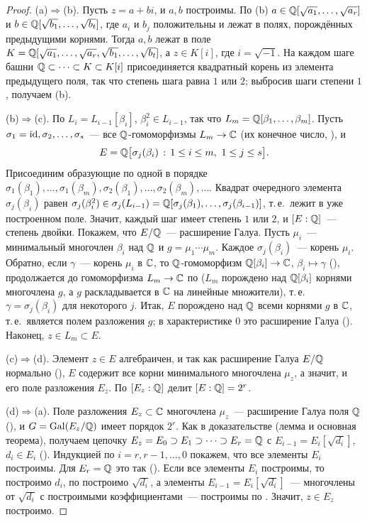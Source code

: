 \begin{proof}
(a)$\Rightarrow$(b). Пусть $z=a+bi$, и $a,b$ построимы. По (b) $a\in\mathbb Q[\sqrt{a_1},\dots,\sqrt{a_r}]$ и
$b\in\mathbb Q[\sqrt{b_1},\dots,\sqrt{b_t}]$, где $a_i$ и $b_j$ положительны и лежат в полях, порождённых предыдущими
корнями. Тогда $a,b$ лежат в поле $K=\mathbb Q[\sqrt{a_1},\dots,\sqrt{a_r},\sqrt{b_1},\dots,\sqrt{b_t}]$, а $z\in K[i]$, где
$i=\sqrt{-1}$. На каждом шаге башни $\mathbb Q\subset\dots\subset K\subset K[i]$ присоединяется квадратный корень из элемента
предыдущего поля, так что степень шага равна $1$ или $2$; выбросив шаги степени $1$, получаем (b).

(b)$\Rightarrow$(c). По  $L_i=L_{i-1}[\beta_i]$, $\beta_i^2\in L_{i-1}$, так что $L_m=\mathbb Q[\beta_1,\dots,\beta_m]$. Пусть
$\sigma_1=\operatorname{id},\sigma_2,\dots,\sigma_s$~--- все $\mathbb Q$-гомоморфизмы $L_m\to\mathbb C$ (их конечное число, ), и
\[
E=\Q\bigl[\sigma_j(\beta_i)\,:\,1\le i\le m,\ 1\le j\le s\bigr].
\]
Присоединим образующие по одной в порядке $\sigma_1(\beta_1),\dots,\sigma_1(\beta_m),\sigma_2(\beta_1),\dots,\sigma_2(\beta_m),\dots$.
Квадрат очередного элемента $\sigma_j(\beta_i)$ равен $\sigma_j(\beta_i^2)\in\sigma_j(L_{i-1})=\mathbb Q[\sigma_j(\beta_1),\dots,\sigma_j(\beta_{i-1})]$,
т.\,е.\ лежит в уже построенном поле. Значит, каждый шаг имеет степень $1$ или $2$, и $[E:\mathbb Q]$~--- степень двойки.
Покажем, что $E/\mathbb Q$~--- расширение Галуа. Пусть $\mu_i$~--- минимальный многочлен $\beta_i$ над $\mathbb Q$ и
$g=\mu_1\cdots\mu_m$. Каждое $\sigma_j(\beta_i)$~--- корень $\mu_i$. Обратно, если $\gamma$~--- корень $\mu_i$ в $\mathbb C$, то
$\mathbb Q$-гомоморфизм $\mathbb Q[\beta_i]\to\mathbb C$, $\beta_i\mapsto\gamma$ (), продолжается до гомоморфизма $L_m\to\mathbb C$ по 
($L_m$ порождено над $\mathbb Q[\beta_i]$ корнями многочлена $g$, а $g$ раскладывается в $\mathbb C$ на линейные множители), т.\,е.\
$\gamma=\sigma_j(\beta_i)$ для некоторого $j$. Итак, $E$ порождено над $\mathbb Q$ всеми корнями $g$ в $\mathbb C$, т.\,е.\ является полем
разложения $g$; в характеристике $0$ это расширение Галуа (\rf{3.10}). Наконец, $z\in L_m\subset E$.

(c)$\Rightarrow$(d). Элемент $z\in E$ алгебраичен, и так как расширение Галуа $E/\mathbb Q$ нормально (), $E$ содержит все
корни минимального многочлена $\mu_z$, а значит, и его поле разложения $E_z$. По \rf{1.20} $[E_z:\mathbb Q]$ делит
$[E:\mathbb Q]=2^r$.

(d)$\Rightarrow$(a). Поле разложения $E_z\subset\mathbb C$ многочлена $\mu_z$~--- расширение Галуа поля $\mathbb Q$ (), и
$G=\operatorname{Gal}(E_z/\mathbb Q)$ имеет порядок $2^r$. Как в доказательстве \rf{3.24} (лемма \rf{3.24a} и основная теорема),
получаем цепочку $E_z=E_0\supset E_1\supset\dots\supset E_r=\mathbb Q$ с $E_{i-1}=E_i[\sqrt{d_i}]$, $d_i\in E_i$ (). Индукцией по
$i=r,r-1,\dots,0$ покажем, что все элементы $E_i$ построимы. Для $E_r=\mathbb Q$ это так (). Если все элементы
$E_i$ построимы, то построимо $d_i$, по  построимо $\sqrt{d_i}$, а элементы $E_{i-1}=E_i[\sqrt{d_i}]$~---
многочлены от $\sqrt{d_i}$ с построимыми коэффициентами~--- построимы по \rf{3.25a}. Значит, $z\in E_z$ построимо.


\end{proof}
